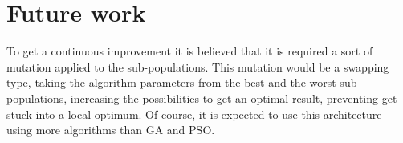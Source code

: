 \documentclass[runningheads]{llncs}
\begin{document}
\section{Future work}

To get a continuous improvement it is believed that it is required a sort of
mutation applied to the sub-populations. This mutation would be a swapping type,
taking the algorithm parameters from the best and the worst sub-populations,
increasing the possibilities to get an optimal result, preventing get stuck into
a local optimum. Of course, it is expected to use this architecture using more
algorithms than GA and PSO.



      
  
\end{document}
